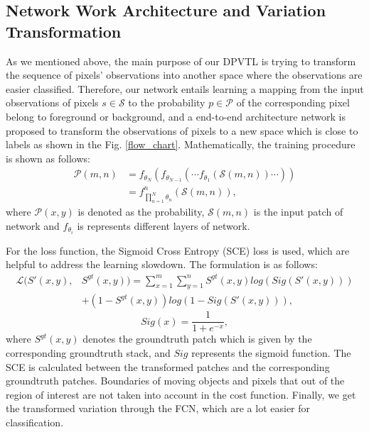 \documentclass[journal]{IEEEtran}
\newcommand{\reffig}[1]{Fig. \ref{#1}}
\begin{document}
\subsection*{Network Work Architecture and Variation Transformation}
As we mentioned above,
the main purpose of our DPVTL is trying to transform the sequence of pixels' observations 
into another space where the observations are easier classified.
Therefore,
our network entails learning a mapping from the input observations of pixels $s \in \mathcal{S}$ 
to the probability $p \in \mathcal{P}$ of the corresponding pixel belong to foreground or background,
and a end-to-end architecture network is proposed to transform the observations of pixels to a new space which is close to labels as shown in the \reffig{flow_chart}.
%
Mathematically, the training procedure is shown as follows:
\begin{equation}
    \begin{split}
        \mathcal{P}(m,n) & = f_{\theta_N} ( f_{\theta_{N - 1}} ( \cdots f_{\theta_1} ( \mathcal{S}(m,n)) \cdots  ) )  \\
          & = f_{ \prod_{n=1}^{N}\theta_n   }^n(\mathcal{S}(m,n)),
    \end{split}
\end{equation}
where $\mathcal{P}(x,y)$ is denoted as the probability, $\mathcal{S}(m,n)$ is the input patch of network and $f_{\theta_i}$ is represents different layers of network.

For the loss function, the Sigmoid Cross Entropy (SCE) loss is used, which are helpful to address the learning slowdown. 
The formulation is as follows:
\begin{equation}
    \begin{split}
         \mathcal{L}(S'(x,y),& S^{gt}(x,y))  =  \sum_{x=1}^{m}\sum_{y=1}^{n} S^{gt}(x,y) log(Sig(S'(x,y)))  \\
        & + (1 - S^{gt}(x,y)) log(1 - Sig(S'(x,y))), 
    \end{split}
\end{equation}
\begin{equation}
       Sig(x) =\frac{1}{1+e^{-x}},
\end{equation}
where $S^{gt}(x,y)$ denotes the groundtruth patch which is given by the corresponding groundtruth stack, and $Sig$ represents the sigmoid function. 
The SCE is calculated between the transformed patches and the corresponding groundtruth patches. 
Boundaries of moving objects and pixels that out of the region of interest are not taken into account in the cost function.
Finally, we get the transformed variation through the FCN, which are a lot easier for classification. 
\end{document}

